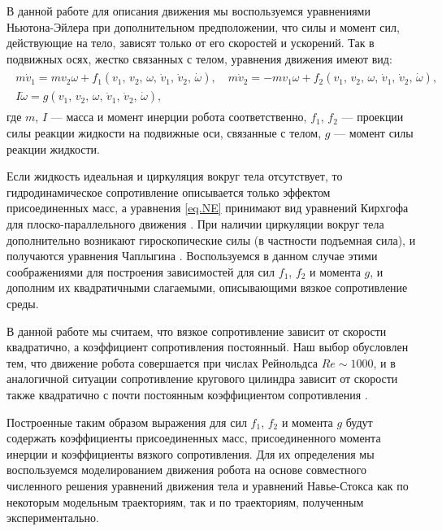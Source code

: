 В данной работе для описания движения мы воспользуемся уравнениями Ньютона-Эйлера при дополнительном предположении, что силы и момент сил, действующие на тело, зависят только от его скоростей и ускорений. Так в подвижных осях, жестко связанных с телом, уравнения движения имеют вид:
\begin{gather}
\begin{gathered}
m \dot{v}_1 = m v_2 \omega + f_1 (v_1,\, v_2,\, \omega,\, \dot{v}_1,\, \dot{v}_2,\, \dot \omega),\quad m \dot{v}_2 = -m v_1 \omega + f_2 (v_1,\, v_2,\, \omega,\, \dot{v}_1,\, \dot{v}_2,\, \dot \omega),\\
I \dot{\omega} = g (v_1,\, v_2,\, \omega,\, \dot{v}_1,\, \dot{v}_2,\, \dot \omega),
\end{gathered}\label{eq.NE}
\end{gather}
где $m$, $I$ --- масса и момент инерции робота соответственно, $f_1$, $f_2$ --- проекции силы реакции жидкости на подвижные оси, связанные с телом, $g$ --- момент силы реакции жидкости. 

Если жидкость идеальная и циркуляция вокруг тела отсутствует, то гидродинамическое сопротивление описывается только эффектом присоединенных масс, а уравнения \eqref{eq.NE} принимают вид уравнений Кирхгофа для плоско-параллельного движения \cite{Kirchhoff}. При наличии циркуляции вокруг тела дополнительно возникают гироскопические силы (в частности подъемная сила), и получаются уравнения Чаплыгина \cite{Borisov_Mamaev, Chaplygin}. Воспользуемся в данном случае этими соображениями для построения зависимостей для сил $f_1$, $f_2$ и момента $g$, и дополним их квадратичными слагаемыми, описывающими вязкое сопротивление среды.

В данной работе мы считаем, что вязкое сопротивление зависит от скорости квадратично, а коэффициент сопротивления постоянный. Наш выбор обусловлен тем, что движение робота совершается при числах Рейнольдса $Re \sim 1000$, и в аналогичной ситуации сопротивление кругового цилиндра зависит от скорости также квадратично с почти постоянным коэффициентом сопротивления \cite{Schlichting}.

Построенные таким образом выражения для сил $f_1$, $f_2$ и момента $g$ будут содержать коэффициенты присоединенных масс, присоединенного момента инерции и коэффициенты вязкого сопротивления. Для их определения мы воспользуемся моделированием движения робота на основе совместного численного решения уравнений движения тела и уравнений Навье-Стокса как по некоторым модельным траекториям, так и по траекториям, полученным экспериментально.

